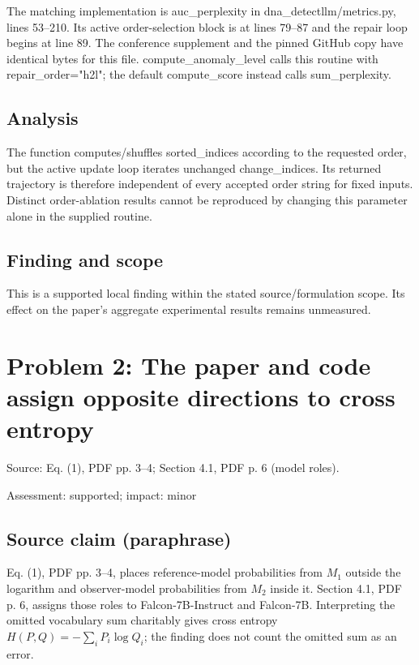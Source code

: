 \documentclass[11pt]{article}
\begin{document}
The matching implementation is auc\_perplexity in dna\_detectllm/metrics.py, lines 53–210. Its active order-selection block is at lines 79–87 and the repair loop begins at line 89. The conference supplement and the pinned GitHub copy have identical bytes for this file. compute\_anomaly\_level calls this routine with repair\_order="h2l"; the default compute\_score instead calls sum\_perplexity.

\subsection*{Analysis}

The function computes/shuffles sorted\_indices according to the requested order, but the active update loop iterates unchanged change\_indices. Its returned trajectory is therefore independent of every accepted order string for fixed inputs. Distinct order-ablation results cannot be reproduced by changing this parameter alone in the supplied routine.

\subsection*{Finding and scope}

This is a supported local finding within the stated source/formulation scope. Its effect on the paper's aggregate experimental results remains unmeasured.

\section*{Problem 2: The paper and code assign opposite directions to cross entropy}

Source: Eq. (1), PDF pp. 3–4; Section 4.1, PDF p. 6 (model roles).

Assessment: supported; impact: minor

\subsection*{Source claim (paraphrase)}

Eq. (1), PDF pp. 3–4, places reference-model probabilities from \(M_1\) outside the logarithm and observer-model probabilities from \(M_2\) inside it. Section 4.1, PDF p. 6, assigns those roles to Falcon-7B-Instruct and Falcon-7B. Interpreting the omitted vocabulary sum charitably gives cross entropy \(H(P,Q)=-\sum_iP_i\log Q_i\); the finding does not count the omitted sum as an error.
\end{document}
